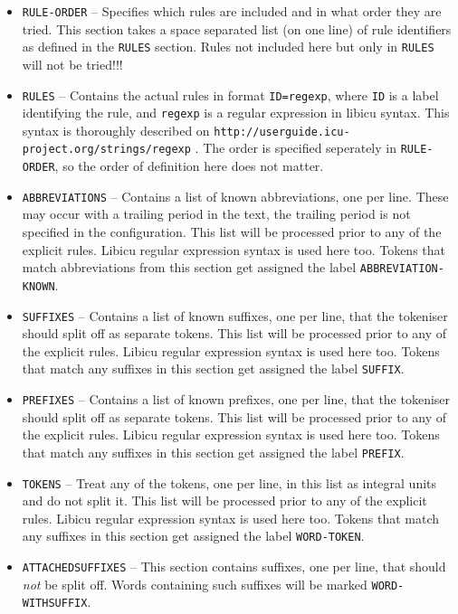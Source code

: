 \documentclass[a4paper,12pt]{report}
\begin{document}
\begin{itemize}
\item \texttt{RULE-ORDER} -- Specifies which rules are included and in what order they are tried. This section takes a space separated list (on one line) of rule identifiers as defined in the \texttt{RULES} section. Rules not included here but only in \texttt{RULES} will not be tried!!!
\item \texttt{RULES} -- Contains the actual rules in format \texttt{ID=regexp}, where \texttt{ID} is a label identifying the rule, and \texttt{regexp} is a regular expression in libicu syntax. This syntax is thoroughly described on \texttt{http://userguide.icu-project.org/strings/regexp} . The order is specified seperately in \texttt{RULE-ORDER}, so the order of definition here does not matter.
\item \texttt{ABBREVIATIONS} -- Contains a list of known abbreviations, one per line. These may occur with a trailing period in the text, the trailing period is not specified in the configuration. This list will be processed prior to any of the explicit rules. Libicu regular expression syntax is used here too. Tokens that match abbreviations from this section get assigned the label \texttt{ABBREVIATION-KNOWN}.
\item \texttt{SUFFIXES} -- Contains a list of known suffixes, one per line, that the tokeniser should split off as separate tokens.  This list will be processed prior to any of the explicit rules. Libicu regular expression syntax is used here too. Tokens that match any suffixes in this section get assigned the label \texttt{SUFFIX}.
\item \texttt{PREFIXES} -- Contains a list of known prefixes, one per line, that the tokeniser should split off as separate tokens.  This list will be processed prior to any of the explicit rules. Libicu regular expression syntax is used here too. Tokens that match any suffixes in this section get assigned the label \texttt{PREFIX}.
\item \texttt{TOKENS} -- Treat any of the tokens, one per line, in this list as integral units and do not split it. This list will be processed prior to any of the explicit rules. Libicu regular expression syntax is used here too. Tokens that match any suffixes in this section get assigned the label \texttt{WORD-TOKEN}.
\item \texttt{ATTACHEDSUFFIXES} -- This section contains suffixes, one per line, that should \emph{not} be split off. Words containing such suffixes will be marked \texttt{WORD-WITHSUFFIX}.

\end{itemize}
\end{document}
